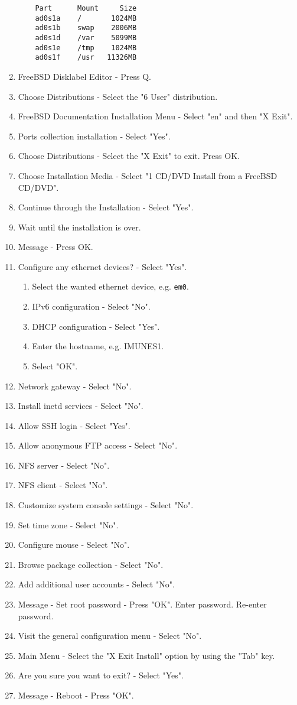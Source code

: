 \begin{enumerate}
    \begin{verbatim}
    Part      Mount     Size
    ad0s1a    /       1024MB
    ad0s1b    swap    2006MB
    ad0s1d    /var    5099MB
    ad0s1e    /tmp    1024MB
    ad0s1f    /usr   11326MB
    \end{verbatim}
\item FreeBSD Disklabel Editor - Press Q.
\item Choose Distributions - Select the "6 User" distribution.
\item FreeBSD Documentation Installation Menu - Select "en" and then "X Exit".
\item Ports collection installation - Select "Yes".
\item Choose Distributions - Select the "X Exit" to exit. Press OK.
\item Choose Installation Media - Select "1 CD/DVD Install from a FreeBSD CD/DVD".
\item Continue through the Installation - Select "Yes".
\item Wait until the installation is over.
\item Message - Press OK.
\item Configure any ethernet devices? - Select "Yes".
    \begin{enumerate}
    \item Select the wanted ethernet device, e.g. \texttt{em0}.
    \item IPv6 configuration - Select "No".
    \item DHCP configuration - Select "Yes".
    \item Enter the hostname, e.g. IMUNES1.
    \item Select "OK".
    \end{enumerate}
\item Network gateway - Select "No".
\item Install inetd services - Select "No".
\item Allow SSH login - Select "Yes".
\item Allow anonymous FTP access - Select "No".
\item NFS server - Select "No".
\item NFS client - Select "No".
\item Customize system console settings - Select "No".
\item Set time zone - Select "No".
\item Configure mouse - Select "No".
\item Browse package collection - Select "No".
\item Add additional user accounts - Select "No".
\item Message - Set root password - Press "OK". Enter password. Re-enter
password.
\item Visit the general configuration menu - Select "No".
\item Main Menu - Select the "X Exit Install" option by using the "Tab" key.
\item Are you sure you want to exit? - Select "Yes".
\item Message - Reboot - Press "OK".
\end{enumerate}

